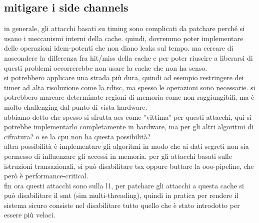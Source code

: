 \documentclass[12pt, oneside]{extbook} %
\begin{document}
\subsection{mitigare i side channels}
in generale, gli attacchi basati su timing sono complicati da patchare perché si usano i meccanismi interni della cache. quindi, dovremmo poter implementare delle operazioni idem-potenti che non diano leaks sul tempo. ma cercare di nascondere la differenza fra hit/miss della cache e per poter riuscire a liberarsi di questi problemi occorrerebbe non usare la cache che non ha senso.\\ si potrebbero applicare una strada più dura, quindi ad esempio restringere dei timer ad alta risoluzione come la rdtsc, ma spesso le operazioni sono necessarie. si potrebbero marcare determinate regioni di memoria come non raggiungibili, ma è molto challenging dal punto di vista hardware.\\ abbiamo detto che spesso si sfrutta aes come "vittima" per questi attacchi, qui si potrebbe implementarlo completamente in hardware, ma per gli altri algoritmi di cifratura? o se la cpu non ha questa possibilità?\\ altra possibilità è implementare gli algoritmi in modo che ai dati segreti non sia permesso di influenzare gli accessi in memoria. per gli attacchi basati sulle istruzioni transazionali, si può disabilitare tsx oppure buttare la ooo-pipeline, che però è performance-critical.\\ fin ora questi attacchi sono sulla l1, per patchare gli attacchi a questa cache si può disabilitare il smt (sim multi-threading), quindi in pratica per rendere il sistema sicuro consiste nel disabilitare tutto quello che è stato introdotto per essere più veloci.
\end{document}
